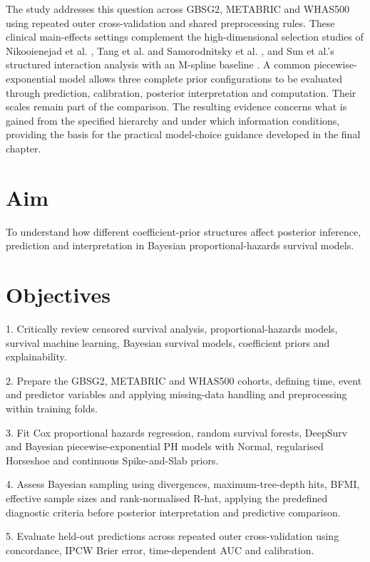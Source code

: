 The study addresses this question across GBSG2, METABRIC and WHAS500 using repeated outer cross-validation and shared preprocessing rules. These clinical main-effects settings complement the high-dimensional selection studies of Nikooienejad et al. \cite{ref6}, Tang et al. \cite{ref25} and Samorodnitsky et al. \cite{ref42}, and Sun et al.'s structured interaction analysis with an M-spline baseline \cite{ref52}. A common piecewise-exponential model allows three complete prior configurations to be evaluated through prediction, calibration, posterior interpretation and computation. Their scales remain part of the comparison. The resulting evidence concerns what is gained from the specified hierarchy and under which information conditions, providing the basis for the practical model-choice guidance developed in the final chapter.

\section{Aim}\label{aim}

To understand how different coefficient-prior structures affect posterior inference, prediction and interpretation in Bayesian proportional-hazards survival models.

\section{Objectives}\label{objectives}

1. Critically review censored survival analysis, proportional-hazards models, survival machine learning, Bayesian survival models, coefficient priors and explainability.

2. Prepare the GBSG2, METABRIC and WHAS500 cohorts, defining time, event and predictor variables and applying missing-data handling and preprocessing within training folds.

3. Fit Cox proportional hazards regression, random survival forests, DeepSurv and Bayesian piecewise-exponential PH models with Normal, regularised Horseshoe and continuous Spike-and-Slab priors.

4. Assess Bayesian sampling using divergences, maximum-tree-depth hits, BFMI, effective sample sizes and rank-normalised R-hat, applying the predefined diagnostic criteria before posterior interpretation and predictive comparison.

5. Evaluate held-out predictions across repeated outer cross-validation using concordance, IPCW Brier error, time-dependent AUC and calibration.

